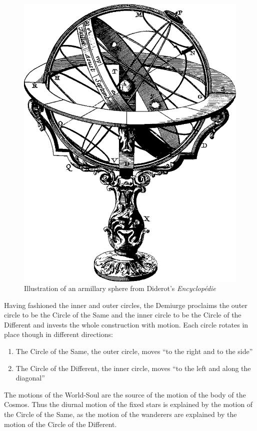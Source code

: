 \begin{figure}[htbp]
     \centering
         \includegraphics[scale=0.20]{graphics/Armillary_sphere.png}
     \caption{Illustration of an armillary sphere from Diderot's \emph{Encyclopédie}}
     \label{fig:2}
\end{figure}

Having fashioned the inner and outer circles, the Demiurge proclaims the outer circle to be the Circle of the Same and the inner circle to be the Circle of the Different and invests the whole construction with motion. Each circle rotates in place though in different directions:
\begin{enumerate}[(1)]
	\item The Circle of the Same, the outer circle, moves ``to the right and to the side''
	\item The Circle of the Different, the inner circle, moves ``to the left and along the diagonal''
\end{enumerate}
The motions of the World-Soul are the source of the motion of the body of the Cosmos. Thus the diurnal motion of the fixed stars is explained by the motion of the Circle of the Same, as the motion of the wanderers are explained by the motion of the Circle of the Different.

